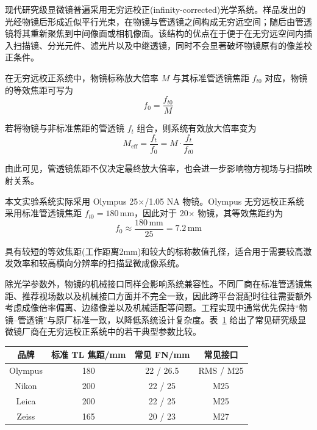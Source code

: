 现代研究级显微镜普遍采用无穷远校正(infinity-corrected)光学系统。样品发出的光经物镜后形成近似平行光束，在物镜与管透镜之间构成无穷远空间；随后由管透镜将其重新聚焦到中间像面或相机像面。该结构的优点在于便于在无穷远空间内插入扫描镜、分光元件、滤光片以及中继透镜，同时不会显著破坏物镜原有的像差校正条件。

在无穷远校正系统中，物镜标称放大倍率 $M$ 与其标准管透镜焦距 $f_{t0}$ 对应，物镜的等效焦距可写为
\begin{equation}
f_{0}=\frac{f_{t0}}{M}
\label{eq:f0_def}
\end{equation}

若将物镜与非标准焦距的管透镜 $f_t$ 组合，则系统有效放大倍率变为
\begin{equation}
M_{\mathrm{eff}}=\frac{f_t}{f_0}=M\cdot\frac{f_t}{f_{t0}}
\label{eq:Meff_def}
\end{equation}

由此可见，管透镜焦距不仅决定最终放大倍率，也会进一步影响物方视场与扫描映射关系。

本文实验系统实际采用 Olympus 25$\times$/1.05 NA 物镜。Olympus 无穷远校正系统采用标准管透镜焦距 $f_{t0}=180\,\mathrm{mm}$，因此对于 20$\times$ 物镜，其等效焦距约为
\begin{equation}
f_0 \approx \frac{180\,\mathrm{mm}}{25}=7.2\,\mathrm{mm}
\label{eq:f0_olympus20x}
\end{equation}

具有较短的等效焦距(工作距离2mm)和较大的标称数值孔径，适合用于需要较高激发效率和较高横向分辨率的扫描显微成像系统。

除光学参数外，物镜的机械接口同样会影响系统兼容性。不同厂商在标准管透镜焦距、推荐视场数以及机械接口方面并不完全一致，因此跨平台混配时往往需要额外考虑成像倍率偏离、边缘像差以及机械适配等问题。工程实现中通常优先保持``物镜--管透镜''与原厂标准一致，以降低系统设计复杂度。表~\ref{tab:objective_brand_compare} 给出了常见研究级显微镜厂商在无穷远校正系统中的若干典型参数比较。

\begin{table}[htbp]
\centering
{}
\label{tab:objective_brand_compare}
\setlength{\tabcolsep}{4pt}
\begin{tabular}{|c|c|c|c|}
\hline
品牌 & 标准 TL 焦距/mm & 常见 FN/mm & 常见接口 \\ \hline
Olympus & 180 & 22 / 26.5 & RMS / M25 \\ \hline
Nikon   & 200 & 22 / 25   & M25 \\ \hline
Leica   & 200 & 22 / 25   & M25 \\ \hline
Zeiss   & 165 & 20 / 23   & M27 \\ \hline
\end{tabular}
\end{table}




